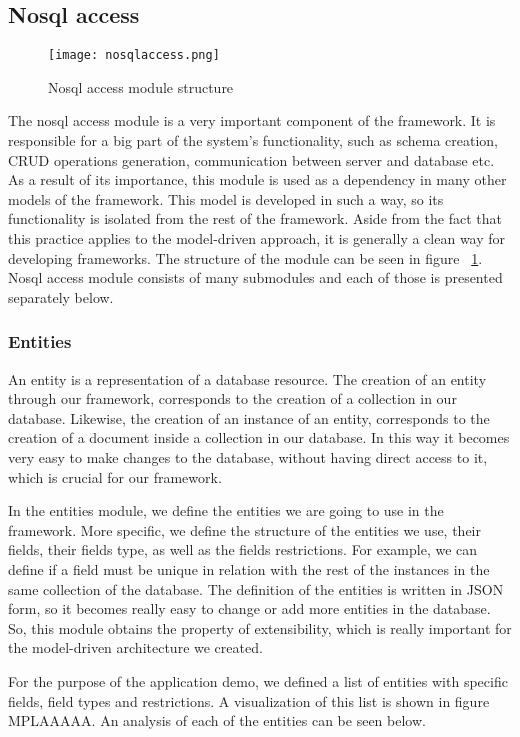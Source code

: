 \subsection{Nosql access}
\begin{figure}
	\texttt{[image: nosqlaccess.png]}
	\caption{Nosql access module structure}
	\label{nosqlaccess}
\end{figure}
The nosql access module is a very important component of the framework. It is responsible for a big part of the system's functionality, such as schema creation, CRUD operations generation, communication between server and database etc. As a result of its importance, this module is used as a dependency in many other models of the framework. This model is developed in such a way, so its functionality is isolated from the rest of the framework. Aside from the fact that this practice applies to the model-driven approach, it is generally a clean way for developing frameworks. The structure of the module can be seen in figure ~\ref{nosqlaccess}. Nosql access module consists of many submodules and each of those is presented separately below. 

\subsubsection{Entities}
\label{entities}
An entity is a representation of a database resource. The creation of an entity through our framework, corresponds to the creation of a collection in our database. Likewise, the creation of an instance of an entity, corresponds to the creation of a document inside a collection in our database. In this way it becomes very easy to make changes to the database, without having direct access to it, which is crucial for our framework.\par
	In the entities module, we define the entities we are going to use in the framework. More specific, we define the structure of the entities we use, their fields, their fields type, as well as the fields restrictions. For example, we can define if a field must be unique in relation with the rest of the instances in the same collection of the database. The definition of the entities is written in JSON form, so it becomes really easy to change or add more entities in the database. So, this module obtains the property of extensibility, which is really important for the model-driven architecture we created. \par 
	For the purpose of the application demo, we defined a list of entities with specific fields, field types and restrictions. A visualization of this list is shown in figure MPLAAAAA. An analysis of each of the entities can be seen below.\par
	
